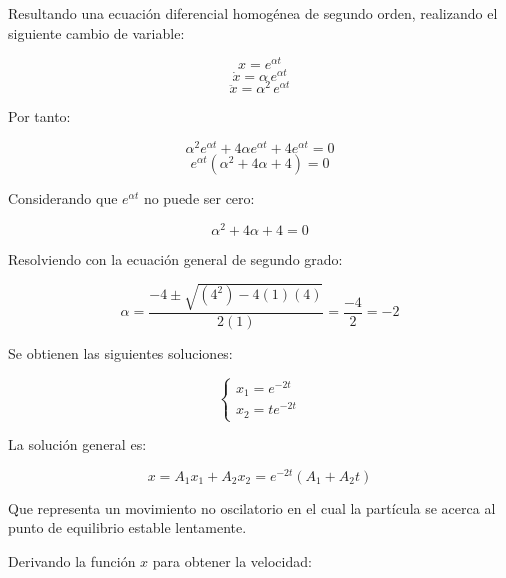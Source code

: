 \documentclass[letter,11pt]{article}
\begin{document}
Resultando una ecuación diferencial homogénea de segundo orden, realizando el
siguiente cambio de variable:

\begin{equation*}
    x = e^{\alpha t}
\end{equation*}
\begin{equation*}
    \dot{x} = \alpha\, e^{\alpha t}
\end{equation*}
\begin{equation*}
    \ddot{x} = \alpha^2\, e^{\alpha t}
\end{equation*}

Por tanto:

\begin{equation*}
    \alpha^2e^{\alpha t} + 4\alpha e^{\alpha t} + 4e^{\alpha t} = 0
\end{equation*}
\begin{equation*}
    e^{\alpha t} (\alpha^2 + 4\alpha + 4 ) = 0
\end{equation*}

Considerando que $e^{\alpha t}$ no puede ser cero:

\begin{equation*}
    \alpha^2 + 4\alpha + 4 = 0
\end{equation*}

Resolviendo con la ecuación general de segundo grado:

\begin{equation*}
    \alpha = \frac{-4 \pm \sqrt{(4^2) - 4(1)(4)}}{2(1)} = \frac{-4}{2} = -2
\end{equation*}

Se obtienen las siguientes soluciones:

\begin{equation*}
    \begin{cases}
        x_1 = e^{-2t} \\
        x_2 = t e^{-2t}
    \end{cases}
\end{equation*}

La solución general es:

\begin{equation}
    x = A_1 x_1 + A_2 x_2 = e^{-2t} (A_1 + A_2 t)
\end{equation}

Que representa un movimiento no oscilatorio en el cual la partícula se acerca al
punto de equilibrio estable lentamente.

Derivando la función $x$ para obtener la velocidad:
\end{document}
